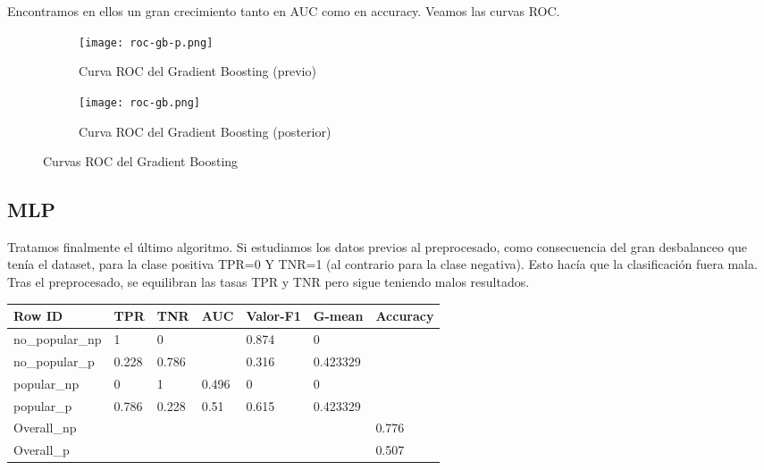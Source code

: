 Encontramos en ellos un gran crecimiento tanto en AUC como en accuracy. Veamos las curvas ROC.

\begin{figure}[H]
	\begin{subfigure}{.5\textwidth}
		\centering
		\texttt{[image: roc-gb-p.png]}
		\caption{Curva ROC del Gradient Boosting (previo)}
		\label{fig:rcgbp}
	\end{subfigure}%
	\begin{subfigure}{.5\textwidth}
		\centering
		\texttt{[image: roc-gb.png]}
		\caption{Curva ROC del Gradient Boosting (posterior)}
		\label{fig:rcgb}
	\end{subfigure}
	\caption{Curvas ROC del Gradient Boosting}
	\label{fig:gb}
\end{figure}

\subsection{MLP}

Tratamos finalmente el último algoritmo. Si estudiamos los datos previos al preprocesado, como consecuencia del gran desbalanceo que tenía el dataset, para la clase positiva TPR=0 Y TNR=1 (al contrario para la clase negativa). Esto hacía que la clasificación fuera mala. Tras el preprocesado, se equilibran las tasas TPR y TNR pero sigue teniendo malos resultados.

\begin{table}[H]
	\centering
	\begin{tabular}{|l|l|l|l|l|l|l|}
		\hline
		Row ID          & TPR   & TNR   & AUC   & Valor-F1 & G-mean   & Accuracy \\ \hline
		no\_popular\_np & 1     & 0     &       & 0.874    & 0        &          \\ \hline
		no\_popular\_p  & 0.228 & 0.786 &       & 0.316    & 0.423329 &          \\ \hline
		popular\_np     & 0     & 1     & 0.496 & 0        & 0        &          \\ \hline
		popular\_p      & 0.786 & 0.228 & 0.51  & 0.615    & 0.423329 &          \\ \hline
		Overall\_np     &       &       &       &          &          & 0.776    \\ \hline
		Overall\_p      &       &       &       &          &          & 0.507    \\ \hline
	\end{tabular}
\end{table}

